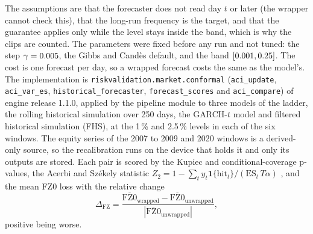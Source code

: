 The assumptions are that the forecaster does not read day $t$ or later (the wrapper cannot check this), that the long-run frequency is the target, and that the guarantee applies only while the level stays inside the band, which is why the clips are counted. The parameters were fixed before any run and not tuned: the step $\gamma=0.005{}$, the Gibbs and Cand\`es default, and the band $[0.001{},0.25{}]$. The cost is one forecast per day, so a wrapped forecast costs the same as the model's. The implementation is \texttt{riskvalidation.market.conformal} (\texttt{aci\_update}, \texttt{aci\_var\_es}, \texttt{historical\_forecaster}, \texttt{forecast\_scores} and \texttt{aci\_compare}) of engine release 1.1.0, applied by the pipeline module  to three models of the ladder, the rolling historical simulation over 250 days, the GARCH-$t$ model and filtered historical simulation (FHS), at the 1\,\% and 2.5\,\% levels in each of the six windows. The equity series of the 2007 to 2009 and 2020 windows is a derived-only source, so the recalibration runs on the device that holds it and only its outputs are stored. Each pair is scored by the Kupiec and conditional-coverage p-values, the Acerbi and Sz\'ekely statistic $Z_2=1-\sum_t y_t\mathbf 1\{\text{hit}_t\}/(\mathrm{ES}_t\,T\alpha)$ \citep{market:acerbiszekely2014}, and the mean FZ0 loss \citep{market:fisslerziegel2016,market:pattonziegelchen2019} with the relative change
\begin{equation}
\Delta_{\mathrm{FZ}}=\frac{\overline{\mathrm{FZ0}}_{\mathrm{wrapped}}-\overline{\mathrm{FZ0}}_{\mathrm{unwrapped}}}{|\overline{\mathrm{FZ0}}_{\mathrm{unwrapped}}|},
\label{eq:bs16-fz}
\end{equation}
positive being worse.

